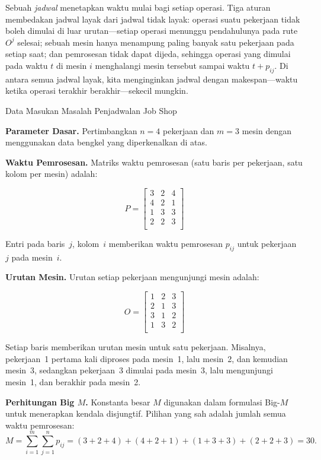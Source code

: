 Sebuah \emph{jadwal} menetapkan waktu mulai bagi setiap operasi.
Tiga aturan membedakan jadwal layak dari jadwal tidak layak: operasi suatu pekerjaan tidak boleh dimulai di luar urutan---setiap operasi menunggu pendahulunya pada rute $O^j$ selesai; sebuah mesin hanya menampung paling banyak satu pekerjaan pada setiap saat; dan pemrosesan tidak dapat dijeda, sehingga operasi yang dimulai pada waktu $t$ di mesin $i$ menghalangi mesin tersebut sampai waktu $t + p_{ij}$.
Di antara semua jadwal layak, kita menginginkan jadwal dengan makespan---waktu ketika operasi terakhir berakhir---sekecil mungkin.



\begin{example}{Data Masukan Masalah Penjadwalan Job Shop}{}

\textbf{Parameter Dasar.}
Pertimbangkan $n = 4$ pekerjaan dan $m = 3$ mesin dengan menggunakan data bengkel yang diperkenalkan di atas.

\textbf{Waktu Pemrosesan.}
Matriks waktu pemrosesan (satu baris per pekerjaan, satu kolom per mesin) adalah:

\[
P =
\begin{bmatrix}
3 & 2 & 4 \\
4 & 2 & 1 \\
1 & 3 & 3 \\
2 & 2 & 3 \\
\end{bmatrix}
\]

Entri pada baris~$j$, kolom~$i$ memberikan waktu pemrosesan $p_{ij}$ untuk pekerjaan~$j$ pada mesin~$i$.

\textbf{Urutan Mesin.}
Urutan setiap pekerjaan mengunjungi mesin adalah:

\[
O =
\begin{bmatrix}
1 & 2 & 3 \\
2 & 1 & 3 \\
3 & 1 & 2 \\
1 & 3 & 2 \\
\end{bmatrix}
\]

Setiap baris memberikan urutan mesin untuk satu pekerjaan.
Misalnya, pekerjaan~1 pertama kali diproses pada mesin~1, lalu mesin~2, dan kemudian mesin~3,
sedangkan pekerjaan~3 dimulai pada mesin~3, lalu mengunjungi mesin~1, dan berakhir pada mesin~2.

\textbf{Perhitungan Big \(M\).}
Konstanta besar $M$ digunakan dalam formulasi Big-$M$ untuk menerapkan kendala disjungtif.
Pilihan yang sah adalah jumlah semua waktu pemrosesan:
\[
M = \sum_{i=1}^{m} \sum_{j=1}^{n} p_{ij} = (3+2+4)+(4+2+1)+(1+3+3)+(2+2+3) = 30.
\]
\end{example}

